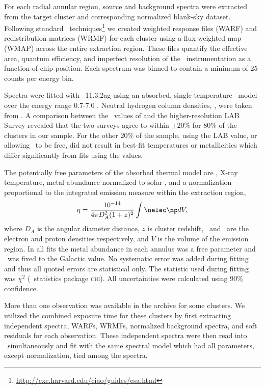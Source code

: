 \documentclass{emulateapj}
\begin{document}
For each radial annular region, source and background spectra were
extracted from the target cluster and corresponding normalized
blank-sky dataset. Following standard
\ciao\ techniques\footnote{\url{http://cxc.harvard.edu/ciao/guides/esa.html}}
we created weighted response files (WARF) and redistribution matrices
(WRMF) for each cluster using a flux-weighted map (WMAP) across the
entire extraction region. These files quantify the effective area,
quantum efficiency, and imperfect resolution of the
\chandra\ instrumentation as a function of chip position. Each
spectrum was binned to contain a minimum of 25 counts per energy bin.

Spectra were fitted with \xspec\ 11.3.2ag \citep{xspec} using an
absorbed, single-temperature \mekal\ model \citep{mekal1, mekal2} over
the energy range 0.7-7.0 \keV. Neutral hydrogen column densities,
\nhi, were taken from \citet{dickeylockman}. A comparison between the
\nhi\ values of \citet{dickeylockman} and the higher-resolution LAB
Survey \citep{lab} revealed that the two surveys agree to within $\pm
20\%$ for 80\% of the clusters in our sample. For the other 20\% of
the sample, using the LAB value, or allowing \nhi\ to be free, did not
result in best-fit temperatures or metallicities which differ
significantly from fits using the \citet{dickeylockman} values.

The potentially free parameters of the absorbed thermal model are
\nhi, X-ray temperature, metal abundance normalized to solar
\citep[elemental ratios taken from][]{ag89}, and a normalization
proportional to the integrated emission measure within the extraction
region,
\begin{equation}
\label{eqn:norm}
\eta = \frac{10^{-14}}{4\pi D_A^2(1+z)^2}\int \nelec \np dV,
\end{equation}
where $D_A$ is the angular diameter distance, $z$ is cluster redshift,
\nelec\ and \np\ are the electron and proton densities respectively,
and $V$ is the volume of the emission region. In all fits the metal
abundance in each annulus was a free parameter and \nhi\ was fixed to
the Galactic value. No systematic error was added during fitting and
thus all quoted errors are statistical only. The statistic used during
fitting was $\chi^2$ (\xspec\ statistics package \textsc{chi}). All
uncertainties were calculated using 90\% confidence.

More than one observation was available in the archive for some
clusters. We utilized the combined exposure time for these clusters by
first extracting independent spectra, WARFs, WRMFs, normalized
background spectra, and soft residuals for each observation. These
independent spectra were then read into \xspec\ simultaneously and fit
with the same spectral model which had all parameters, except
normalization, tied among the spectra.
\end{document}
